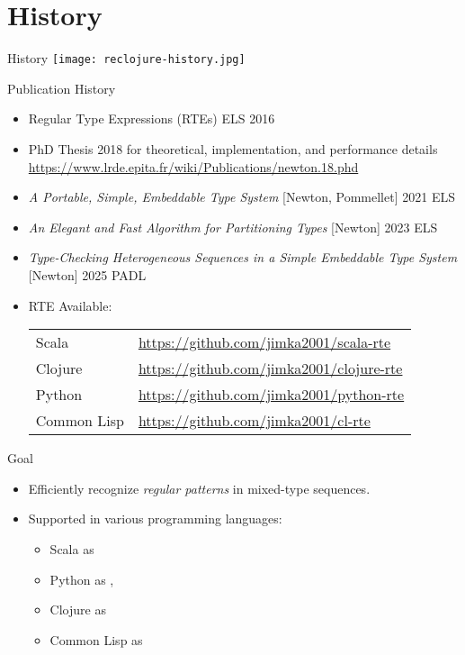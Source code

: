 \section{History}
{  %
\begin{frame}{History}
  \centering
  \texttt{[image: reclojure-history.jpg]}
\end{frame}
}
\begin{frame}{Publication History}
  \begin{itemize}
  \item Regular Type Expressions (RTEs) ELS 2016
  \item PhD Thesis 2018 for theoretical, implementation, and performance details
    \url{https://www.lrde.epita.fr/wiki/Publications/newton.18.phd}
    
  \item \textit{A Portable, Simple, Embeddable Type System} [Newton, Pommellet] 2021 ELS

  \item \textit{An Elegant and Fast Algorithm for Partitioning Types} [Newton] 2023 ELS
  \item \textit{Type-Checking Heterogeneous Sequences in a Simple Embeddable Type System} [Newton] 2025 PADL
  \item   RTE Available:

    \medskip
    
  \begin{tabular}{ll}
    Scala & \url{https://github.com/jimka2001/scala-rte}\\
    Clojure & \url{https://github.com/jimka2001/clojure-rte}\\
    Python & \url{https://github.com/jimka2001/python-rte}\\
    Common Lisp & \url{https://github.com/jimka2001/cl-rte}    
  \end{tabular}
  \end{itemize}
\end{frame}


\begin{frame}{Goal}
  \begin{itemize}
  \item Efficiently recognize \emph{regular patterns} in mixed-type sequences.
  \item Supported in various programming languages:
    \begin{itemize}
    \item Scala as 
    \item Python as , 
    \item Clojure as 
    \item Common Lisp as 
    \end{itemize}

  \end{itemize}
\end{frame}
